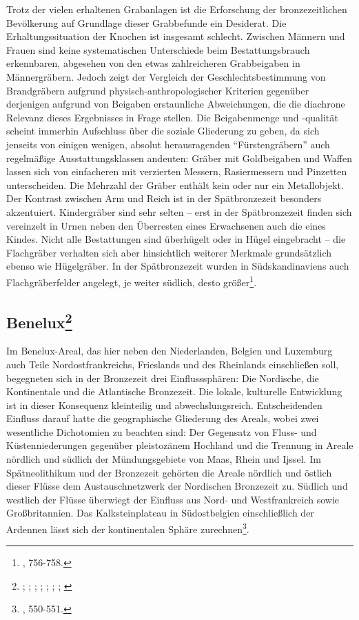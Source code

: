 \documentclass[openany,twoside,twocolumn]{book}
\let\rmarkdownfootnote\footnote%
\def\footnote{\protect\rmarkdownfootnote}
\begin{document}
Trotz der vielen erhaltenen Grabanlagen ist die Erforschung der
bronzezeitlichen Bevölkerung auf Grundlage dieser Grabbefunde ein
Desiderat. Die Erhaltungssituation der Knochen ist insgesamt schlecht.
Zwischen Männern und Frauen sind keine systematischen Unterschiede beim
Bestattungsbrauch erkennbaren, abgesehen von den etwas zahlreicheren
Grabbeigaben in Männergräbern. Jedoch zeigt der Vergleich der
Geschlechtsbestimmung von Brandgräbern aufgrund
physisch-anthropologischer Kriterien gegenüber derjenigen aufgrund von
Beigaben erstaunliche Abweichungen, die die diachrone Relevanz dieses
Ergebnisses in Frage stellen. Die Beigabenmenge und -qualität scheint
immerhin Aufschluss über die soziale Gliederung zu geben, da sich
jenseits von einigen wenigen, absolut herausragenden ``Fürstengräbern''
auch regelmäßige Ausstattungsklassen andeuten: Gräber mit Goldbeigaben
und Waffen lassen sich von einfacheren mit verzierten Messern,
Rasiermessern und Pinzetten unterscheiden. Die Mehrzahl der Gräber
enthält kein oder nur ein Metallobjekt. Der Kontrast zwischen Arm und
Reich ist in der Spätbronzezeit besonders akzentuiert. Kindergräber sind
sehr selten -- erst in der Spätbronzezeit finden sich vereinzelt in
Urnen neben den Überresten eines Erwachsenen auch die eines Kindes.
Nicht alle Bestattungen sind überhügelt oder in Hügel eingebracht -- die
Flachgräber verhalten sich aber hinsichtlich weiterer Merkmale
grundsätzlich ebenso wie Hügelgräber. In der Spätbronzezeit wurden in
Südskandinaviens auch Flachgräberfelder angelegt, je weiter südlich,
desto größer\footnote{\textcite{thrane_scandinavia_2013}, 756-758.}.

\hypertarget{benelux}{%
\subsection[Benelux]{\texorpdfstring{Benelux\footnote{\textcite{beek_circles_2014};
  \textcite{bourgeois_bronze_2008}; \textcite{drenth_mounds_2005};
  \textcite{fokkens_bronze_2013}; \textcite{fontijn_sacrificial_2002};
  \textcite{de_reu_land_2012}; \textcite{lohof_grafritueel_1991};
  \textcite{lohof_tradition_1994}}}{Benelux}}\label{benelux}}

Im Benelux-Areal, das hier neben den Niederlanden, Belgien und Luxemburg
auch Teile Nordostfrankreichs, Frieslands und des Rheinlands
einschließen soll, begegneten sich in der Bronzezeit drei
Einflusssphären: Die Nordische, die Kontinentale und die Atlantische
Bronzezeit. Die lokale, kulturelle Entwicklung ist in dieser Konsequenz
kleinteilig und abwechslungsreich. Entscheidenden Einfluss darauf hatte
die geographische Gliederung des Areals, wobei zwei wesentliche
Dichotomien zu beachten sind: Der Gegensatz von Fluss- und
Küstenniederungen gegenüber pleistozänem Hochland und die Trennung in
Areale nördlich und südlich der Mündungsgebiete von Maas, Rhein und
Ijssel. Im Spätneolithikum und der Bronzezeit gehörten die Areale
nördlich und östlich dieser Flüsse dem Austauschnetzwerk der Nordischen
Bronzezeit zu. Südlich und westlich der Flüsse überwiegt der Einfluss
aus Nord- und Westfrankreich sowie Großbritannien. Das Kalksteinplateau
in Südostbelgien einschließlich der Ardennen lässt sich der
kontinentalen Sphäre zurechnen\footnote{\textcite{fokkens_bronze_2013},
  550-551.}.
\end{document}
